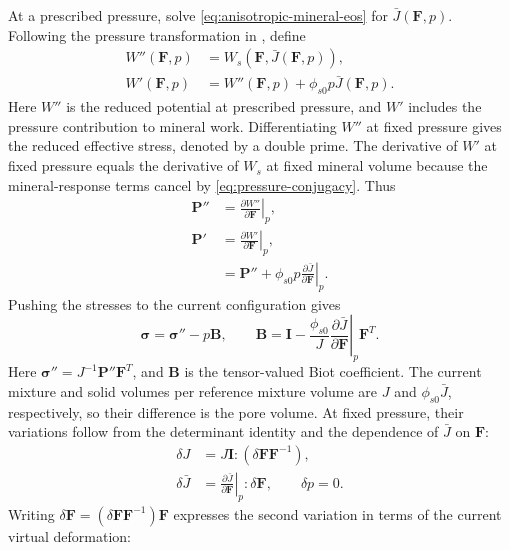 \documentclass[11pt]{article}
\newcommand{\pder}[2]{\frac{\partial #1}{\partial #2}}
\begin{document}
At a prescribed pressure, solve \eqref{eq:anisotropic-mineral-eos} for
\(\bar J(\mathbf F,p)\). Following the pressure transformation in
\citet{fosterxu2025}, define
\begin{align}
 W''(\mathbf F,p)&=W_s(\mathbf F,\bar J(\mathbf F,p)),
 \label{eq:reduced-energy}\\
 W'(\mathbf F,p)&=W''(\mathbf F,p)+\phi_{s0}p\bar J(\mathbf F,p).
 \label{eq:legendre-energy}
\end{align}
Here \(W''\) is the reduced potential at prescribed pressure, and
\(W'\) includes the pressure contribution to mineral work.
Differentiating \(W''\) at fixed pressure gives the reduced effective
stress, denoted by a double prime.
The derivative of \(W'\) at fixed pressure equals the derivative of
\(W_s\) at fixed mineral volume because the mineral-response terms cancel
by \eqref{eq:pressure-conjugacy}. Thus
\begin{align}
 \mathbf P''&=\left.\pder{W''}{\mathbf F}\right|_p,
 \label{eq:fixed-pressure-stress}\\
 \mathbf P'&=\left.\pder{W'}{\mathbf F}\right|_p,
 \label{eq:fixed-mineral-state-stress}\\
 &=\mathbf P''+\phi_{s0}p
       \left.\pder{\bar J}{\mathbf F}\right|_p.
 \label{eq:piola-transform-general}
\end{align}
Pushing the stresses to the current configuration gives
\begin{equation}
 \mathbf\sigma=\mathbf\sigma''-p\mathbf B,\qquad
 \mathbf B=\mathbf I-\frac{\phi_{s0}}J
       \left.\pder{\bar J}{\mathbf F}\right|_p\mathbf F^T.
 \label{eq:finite-biot-tensor}
\end{equation}
Here \(\mathbf\sigma''=J^{-1}\mathbf P''\mathbf F^T\), and
\(\mathbf B\) is the tensor-valued Biot coefficient.
The current mixture and solid volumes per reference mixture volume are
\(J\) and \(\phi_{s0}\bar J\), respectively, so their difference is the
pore volume. At fixed pressure, their variations follow from the
determinant identity and the dependence of \(\bar J\) on \(\mathbf F\):
\begin{align}
 \delta J&=J\mathbf I:(\delta\mathbf F\mathbf F^{-1}),
 \label{eq:pore-volume-mixture-variation}\\
 \delta\bar J&=\left.\pder{\bar J}{\mathbf F}\right|_p:
                  \delta\mathbf F,\qquad \delta p=0.
 \label{eq:pore-volume-mineral-fixed-pressure-variation}
\end{align}
Writing \(\delta\mathbf F=(\delta\mathbf F\mathbf F^{-1})\mathbf F\)
expresses the second variation in terms of the current virtual deformation:
\end{document}
